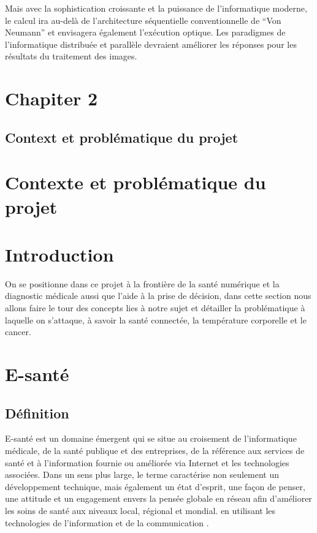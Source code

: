 \documentclass[12pt]{article}
\begin{document}
Mais avec la sophistication croissante et la puissance de l'informatique moderne, le calcul ira au-delà de l'architecture séquentielle conventionnelle de “Von Neumann” et envisagera également l'exécution optique. Les paradigmes de l'informatique distribuée et parallèle devraient améliorer les réponses pour les résultats du traitement des images.
\newpage
\rhead{}
\section*{\Huge{Chapiter 2}}
\subsection*{\huge{Context et problématique du projet}}
\newpage
{}
\section*{Contexte et problématique du projet}
\section{Introduction}
On se positionne dans ce projet à la frontière de la santé numérique et la diagnostic médicale aussi que l'aide à la prise de décision, dans cette section nous allons faire le tour des concepts lies à notre sujet et détailler la problématique à laquelle on s'attaque, à savoir la santé connectée, la température corporelle et le cancer.  
\section{E-santé}
\subsection{Définition}
E-santé est un domaine émergent qui se situe au croisement de l'informatique médicale, de la santé publique et des entreprises, de la référence aux services de santé et à l'information fournie ou améliorée via Internet et les technologies associées. Dans un sens plus large, le terme caractérise non seulement un développement technique, mais également un état d'esprit, une façon de penser, une attitude et un engagement envers la pensée globale en réseau afin d'améliorer les soins de santé aux niveaux local, régional et mondial. en utilisant les technologies de l'information et de la communication \cite{26}.
\end{document}
